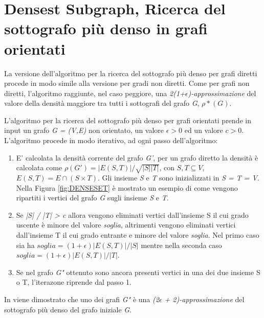 \documentclass[LaM,binding=0.6cm]{sapthesis}
\begin{document}
\section{Densest Subgraph, Ricerca del sottografo più denso in grafi orientati}

La versione dell'algoritmo per la ricerca del sottografo più denso \cite{Bahmani:2012:DSS:2140436.2140442} per grafi diretti procede in modo simile alla versione per gradi non diretti. Come per grafi non diretti, l'algoritmo raggiunte, nel caso peggiore, una \textit{2(1+$\epsilon$)-approssimazione} del valore della densità maggiore tra tutti i sottografi del grafo \textit{G}, \textit{$\rho*(G)$}.

L'algoritmo per la  ricerca del sottografo più denso per grafi orientati prende in input un grafo \textit{G = (V,E)} non orientato, un valore \textit{$\epsilon > 0$} ed un valore \textit{$c > 0$}.
L'algoritmo procede in modo iterativo, ad ogni passo dell'algoritmo:
\begin{enumerate}
\item E' calcolata la densità corrente del grafo \textit{G'}, per un grafo diretto la densità è calcolata come \textit{$\rho(G') = |E(S,T)| /  \sqrt{|S| |T|} $}, con \textit{$S,T \subseteq V$}, $E(S,T) = E \cap (S \times T)$. Gli insieme \textit{S} e \textit{T} sono inizializzati in \textit{S = T = V}. Nella Figura \ref{fig:DENSESET} è mostrato un esempio di come vengono ripartiti i vertici del grafo \textit{G} sugli insieme \textit{S} e \textit{T}.
\item Se \textit{|S| / |T| > c} allora vengono eliminati vertici dall'insieme S il cui grado uscente è minore del valore \textit{soglia}, altrimenti vengono eliminati vertici dall'insieme T il cui grado entrante e minore del valore \textit{soglia}.
Nel primo caso sia ha \textit{$soglia = (1 + \epsilon) |E(S,T)| / |S|$} mentre nella seconda caso \textit{$soglia = (1 + \epsilon) |E(S,T)| / |T|$}.
\item Se nel grafo \textit{G"} ottenuto sono ancora presenti vertici in una dei due insieme S o T, l'iterazone riprende dal passo 1.
\end{enumerate}

In \cite{Bahmani:2012:DSS:2140436.2140442} viene dimostrato che uno dei grafi \textit{G"} è una \textit{(2$\epsilon$ + 2)-approssimazione} del sottografo più denso del grafo iniziale \textit{G}.
\end{document}
